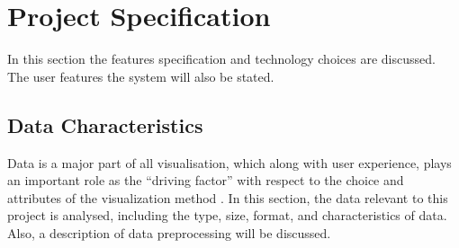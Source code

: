 \clearpage
\section{Project Specification}
In this section the features specification and technology choices are discussed. The user features the system will also be stated.  

\subsection{Data Characteristics}

Data is a major part of all visualisation, which along with user experience, plays an important role as the “driving factor” with respect to the choice and attributes of the visualization method \cite{Laramee}. In this section, the data relevant to this project is analysed, including the type, size, format, and characteristics of data. Also, a description of data preprocessing will be discussed.

